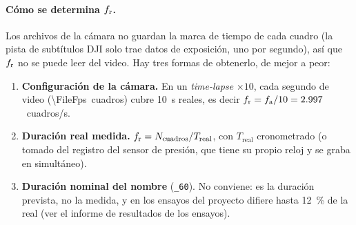 \paragraph{Cómo se determina $f_{\mathrm{r}}$.} Los archivos de la cámara no guardan la marca de tiempo de cada
cuadro (la pista de subtítulos DJI solo trae datos de exposición, uno por segundo), así que
$f_{\mathrm{r}}$ no se puede leer del video. Hay tres formas de obtenerlo, de mejor a peor:
\begin{enumerate}
  \item \textbf{Configuración de la cámara.} En un \emph{time-lapse} $\times 10$, cada segundo de
        video (\num{\FileFps}~cuadros) cubre \SI{10}{\second} reales, es decir
        $f_{\mathrm{r}} = f_{\mathrm{a}}/10 = \num{2.997}$~cuadros/s.
  \item \textbf{Duración real medida.} $f_{\mathrm{r}} = N_{\mathrm{cuadros}}/T_{\mathrm{real}}$, con
        $T_{\mathrm{real}}$ cronometrado (o tomado del registro del sensor de presión, que tiene su
        propio reloj y se graba en simultáneo).
  \item \textbf{Duración nominal del nombre} (\texttt{\_60}). No conviene: es la duración prevista, no
        la medida, y en los ensayos del proyecto difiere hasta \SI{12}{\percent} de la real (ver el informe de
        resultados de los ensayos).
\end{enumerate}

